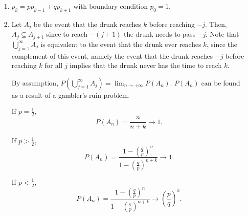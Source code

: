 \begin{enumerate}[label=(\alph*)]
\item $p_{k} = pp_{k-1} + qp_{k+1}$ with boundary condition $p_{0}=1.$

\item Let $A_{j}$ be the event that the drunk reaches $k$ before reaching $-j$.
Then, $A_{j} \subseteq A_{j+1}$ since to reach $-(j+1)$ the drunk needs to pass
$-j$. Note that $\bigcup\limits_{j=1}^{\infty} A_{j}$ is equivalent to
the event that the drunk ever reaches $k$, since the complement of this
event, namely the event that the drunk reaches $-j$ before reaching $k$
for all $j$ implies that the drunk never has the time to reach $k$. 

By assumption, $P(\bigcup\limits_{j=1}^{\infty} A_{j}) = \lim_{n \to +\infty}
P(A_{n}).$ $P(A_{n})$ can be found as a result of a gambler's ruin problem.

If $p=\frac{1}{2}$, $$P(A_{n}) = \frac{n}{n + k} \rightarrow 1.$$

If $p > \frac{1}{2}$, $$P(A_{n}) = \frac{1 - \left(\frac{q}{p}\right)^{n}}{1 -
\left(\frac{q}{p}\right)^{n + k}} \rightarrow 1.$$

If $p < \frac{1}{2}$, $$P(A_{n}) = \frac{1 - \left(\frac{q}{p}\right)^{n}}{1 -
\left(\frac{q}{p}\right)^{n + k}} \rightarrow \left(\frac{p}{q}\right)^{k}.$$
\end{enumerate}